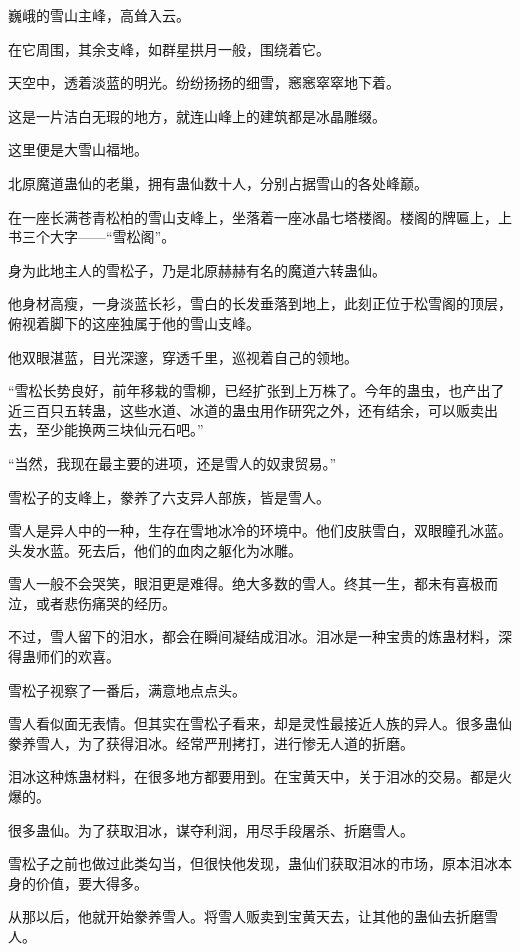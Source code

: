 
\begin{this_body}

巍峨的雪山主峰，高耸入云。

在它周围，其余支峰，如群星拱月一般，围绕着它。

天空中，透着淡蓝的明光。纷纷扬扬的细雪，窸窸窣窣地下着。

这是一片洁白无瑕的地方，就连山峰上的建筑都是冰晶雕缀。

这里便是大雪山福地。

北原魔道蛊仙的老巢，拥有蛊仙数十人，分别占据雪山的各处峰巅。

在一座长满苍青松柏的雪山支峰上，坐落着一座冰晶七塔楼阁。楼阁的牌匾上，上书三个大字——“雪松阁”。

身为此地主人的雪松子，乃是北原赫赫有名的魔道六转蛊仙。

他身材高瘦，一身淡蓝长衫，雪白的长发垂落到地上，此刻正位于松雪阁的顶层，俯视着脚下的这座独属于他的雪山支峰。

他双眼湛蓝，目光深邃，穿透千里，巡视着自己的领地。

“雪松长势良好，前年移栽的雪柳，已经扩张到上万株了。今年的蛊虫，也产出了近三百只五转蛊，这些水道、冰道的蛊虫用作研究之外，还有结余，可以贩卖出去，至少能换两三块仙元石吧。”

“当然，我现在最主要的进项，还是雪人的奴隶贸易。”

雪松子的支峰上，豢养了六支异人部族，皆是雪人。

雪人是异人中的一种，生存在雪地冰冷的环境中。他们皮肤雪白，双眼瞳孔冰蓝。头发水蓝。死去后，他们的血肉之躯化为冰雕。

雪人一般不会哭笑，眼泪更是难得。绝大多数的雪人。终其一生，都未有喜极而泣，或者悲伤痛哭的经历。

不过，雪人留下的泪水，都会在瞬间凝结成泪冰。泪冰是一种宝贵的炼蛊材料，深得蛊师们的欢喜。

雪松子视察了一番后，满意地点点头。

雪人看似面无表情。但其实在雪松子看来，却是灵性最接近人族的异人。很多蛊仙豢养雪人，为了获得泪冰。经常严刑拷打，进行惨无人道的折磨。

泪冰这种炼蛊材料，在很多地方都要用到。在宝黄天中，关于泪冰的交易。都是火爆的。

很多蛊仙。为了获取泪冰，谋夺利润，用尽手段屠杀、折磨雪人。

雪松子之前也做过此类勾当，但很快他发现，蛊仙们获取泪冰的市场，原本泪冰本身的价值，要大得多。

从那以后，他就开始豢养雪人。将雪人贩卖到宝黄天去，让其他的蛊仙去折磨雪人。


\end{this_body}
